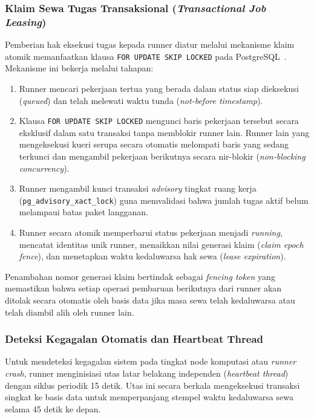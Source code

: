 \subsubsection{Klaim Sewa Tugas Transaksional (\textit{Transactional Job Leasing})}
Pemberian hak eksekusi tugas kepada runner diatur melalui mekanisme klaim atomik memanfaatkan klausa \texttt{FOR UPDATE SKIP LOCKED} pada PostgreSQL~\cite{postgresql_locking}. Mekanisme ini bekerja melalui tahapan:
\begin{enumerate}[label=\arabic*.]
  \item Runner mencari pekerjaan tertua yang berada dalam status siap dieksekusi (\textit{queued}) dan telah melewati waktu tunda (\textit{not-before timestamp}).
  \item Klausa \texttt{FOR UPDATE SKIP LOCKED} mengunci baris pekerjaan tersebut secara eksklusif dalam satu transaksi tanpa memblokir runner lain. Runner lain yang mengeksekusi kueri serupa secara otomatis melompati baris yang sedang terkunci dan mengambil pekerjaan berikutnya secara nir-blokir (\textit{non-blocking concurrency}).
  \item Runner mengambil kunci transaksi \textit{advisory} tingkat ruang kerja (\texttt{pg\_advisory\_xact\_lock}) guna memvalidasi bahwa jumlah tugas aktif belum melampaui batas paket langganan.
  \item Runner secara atomik memperbarui status pekerjaan menjadi \textit{running}, mencatat identitas unik runner, menaikkan nilai generasi klaim (\textit{claim epoch fence}), dan menetapkan waktu kedaluwarsa hak sewa (\textit{lease expiration}).
\end{enumerate}
Penambahan nomor generasi klaim bertindak sebagai \textit{fencing token} yang memastikan bahwa setiap operasi pembaruan berikutnya dari runner akan ditolak secara otomatis oleh basis data jika masa sewa telah kedaluwarsa atau telah diambil alih oleh runner lain.

\subsubsection{Deteksi Kegagalan Otomatis dan Heartbeat Thread}
Untuk mendeteksi kegagalan sistem pada tingkat node komputasi atau \textit{runner crash}, runner menginisiasi utas latar belakang independen (\textit{heartbeat thread}) dengan siklus periodik 15 detik. Utas ini secara berkala mengeksekusi transaksi singkat ke basis data untuk memperpanjang stempel waktu kedaluwarsa sewa selama 45 detik ke depan.

